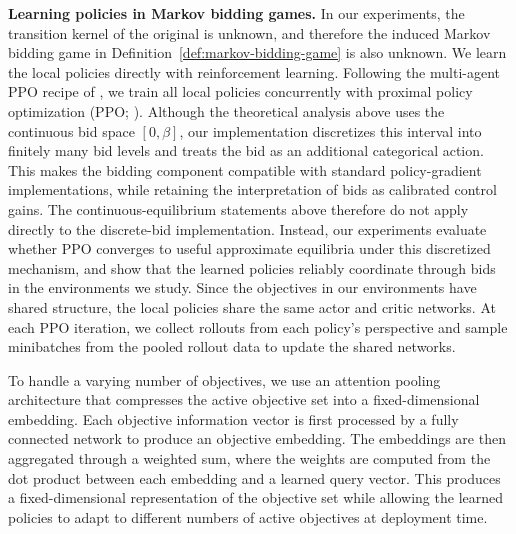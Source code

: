 \smallskip
\noindent\textbf{Learning policies in Markov bidding games.}
In our experiments, the transition kernel of the original \momdp is unknown, and therefore the induced Markov bidding game in Definition~\ref{def:markov-bidding-game} is also unknown.
We learn the local policies directly with reinforcement learning.
Following the multi-agent PPO recipe of \citet{yu2022mappo}, we train all local policies concurrently with proximal policy optimization (PPO; \citealp{schulman2017ppo}).
Although the theoretical analysis above uses the continuous bid space \([0,\beta]\), our implementation discretizes this interval into finitely many bid levels and treats the bid as an additional categorical action.
This makes the bidding component compatible with standard policy-gradient implementations, while retaining the interpretation of bids as calibrated control gains.
The continuous-equilibrium statements above therefore do not apply directly to the discrete-bid implementation.
Instead, our experiments evaluate whether PPO converges to useful approximate equilibria under this discretized mechanism, and show that the learned policies reliably coordinate through bids in the environments we study.
Since the objectives in our environments have shared structure, the local policies share the same actor and critic networks.
At each PPO iteration, we collect rollouts from each policy's perspective and sample minibatches from the pooled rollout data to update the shared networks.

To handle a varying number of objectives, we use an attention pooling architecture that compresses the active objective set into a fixed-dimensional embedding.
Each objective information vector is first processed by a fully connected network to produce an objective embedding.
The embeddings are then aggregated through a weighted sum, where the weights are computed from the dot product between each embedding and a learned query vector.
This produces a fixed-dimensional representation of the objective set while allowing the learned policies to adapt to different numbers of active objectives at deployment time.
